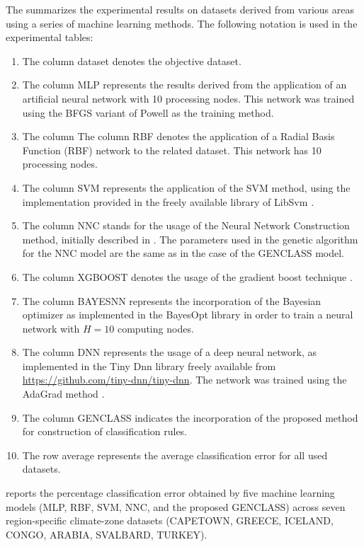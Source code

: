 \documentclass[12pt]{Definitions/academia}
\begin{document}
The  summarizes the experimental
results on datasets derived from various areas using a series of machine
learning methods. The following notation is used in the experimental
tables:
\begin{enumerate}
\item The column dataset denotes the objective dataset.
\item The column MLP represents the results derived from the application
of an artificial neural network with 10 processing nodes. This network
was trained using the BFGS variant of Powell \textit{\cite{M.J.D Powell 1989}}
as the training method.
\item The column The column RBF denotes the application of a Radial Basis
Function (RBF) network\textit{\cite{J. Park 1991,G.A. Montazer 2018}
}to the related dataset. This network has 10 processing nodes.
\item The column SVM represents the application of the SVM method, using
the implementation provided in the freely available library of LibSvm
\textit{\cite{Chang 2011}.}
\item The column NNC stands for the usage of the Neural Network Construction
method, initially described in \textit{\cite{Tsoulos 2008}}. The
parameters used in the genetic algorithm for the NNC model are the
same as in the case of the GENCLASS model.
\item The column XGBOOST denotes the usage of the gradient boost technique \textit{\cite{xgboost}}.
\item The column BAYESNN represents the incorporation of  the Bayesian optimizer as implemented in the BayesOpt  library \textit{\cite{bayesnn}} in order to  train a neural network with $H=10$ computing nodes.
\item The column DNN represents the usage of  a deep neural network, as implemented in the Tiny Dnn library freely available from  \url{https://github.com/tiny-dnn/tiny-dnn}. The network was trained using the  AdaGrad method \textit{\cite{adagrad}}.
\item The column GENCLASS indicates the incorporation of the proposed method
for construction of classification rules.
\item The row average represents the average classification error for all
used datasets.
\end{enumerate}
  reports the percentage
classification error obtained by five machine learning models (MLP,
RBF, SVM, NNC, and the proposed GENCLASS) across seven region-specific
climate-zone datasets (CAPETOWN, GREECE, ICELAND, CONGO, ARABIA, SVALBARD,
TURKEY). 
\end{document}
